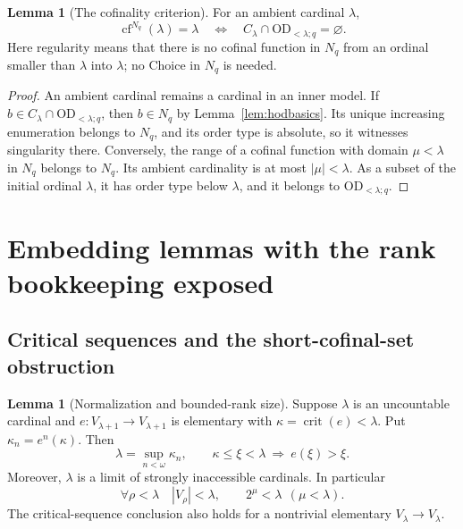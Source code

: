 \documentclass[11pt,letterpaper]{article}
\theoremstyle{definition}
\newtheorem{lemma}[definition]{Lemma}
\numberwithin{equation}{section}
\newcommand{\OD}{\mathrm{OD}}
\newcommand{\crit}{\operatorname{crit}}
\newcommand{\cf}{\operatorname{cf}}
\newcommand{\Clam}{C_\lambda}
\newcommand{\ODq}{\OD_{<\lambda;q}}
\begin{document}
\begin{lemma}[The cofinality criterion]\label{lem:cfcriterion}
For an ambient cardinal $\lambda$,
\[
\cf^{N_q}(\lambda)=\lambda
\quad\Longleftrightarrow\quad
\Clam\cap\ODq=\varnothing.
\]
Here regularity means that there is no cofinal function in $N_q$ from an ordinal smaller than $\lambda$ into $\lambda$; no Choice in $N_q$ is needed.
\end{lemma}

\begin{proof}
An ambient cardinal remains a cardinal in an inner model. If $b\in\Clam\cap\ODq$, then $b\in N_q$ by Lemma~\ref{lem:hodbasics}. Its unique increasing enumeration belongs to $N_q$, and its order type is absolute, so it witnesses singularity there. Conversely, the range of a cofinal function with domain $\mu<\lambda$ in $N_q$ belongs to $N_q$. Its ambient cardinality is at most $|\mu|<\lambda$. As a subset of the initial ordinal $\lambda$, it has order type below $\lambda$, and it belongs to $\ODq$.
\end{proof}

\section{Embedding lemmas with the rank bookkeeping exposed}\label{sec:embeddings}

\subsection{Critical sequences and the short-cofinal-set obstruction}

\begin{lemma}[Normalization and bounded-rank size]\label{lem:critical}
Suppose $\lambda$ is an uncountable cardinal and $e:V_{\lambda+1}\to V_{\lambda+1}$ is elementary with $\kappa=\crit(e)<\lambda$. Put $\kappa_n=e^n(\kappa)$. Then
\[
\lambda=\sup_{n<\omega}\kappa_n,\qquad
\kappa\le\xi<\lambda\ \Longrightarrow\ e(\xi)>\xi.
\]
Moreover, $\lambda$ is a limit of strongly inaccessible cardinals. In particular
\begin{equation}\label{eq:rank-small}
\forall\rho<\lambda\quad |V_\rho|<\lambda,
\qquad 2^\mu<\lambda\ \ (\mu<\lambda).
\end{equation}
The critical-sequence conclusion also holds for a nontrivial elementary $V_\lambda\to V_\lambda$.
\end{lemma}
\end{document}
